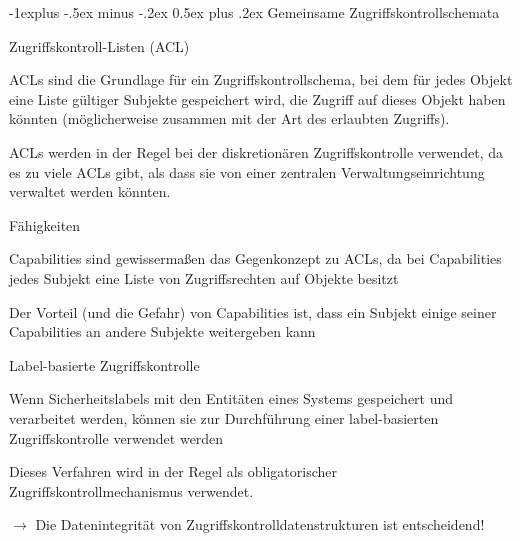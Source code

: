 \documentclass[a4paper]{article}
\makeatletter
\renewcommand{\subsection}{\@startsection{subsection}{2}{0mm}%
 {-1explus -.5ex minus -.2ex}%
 {0.5ex plus .2ex}%
 {\normalfont\normalsize\bfseries}}
\makeatother
\begin{document}
\begin{multicols}{3}

      \subsection{Gemeinsame Zugriffskontrollschemata}
      \begin{itemize*}
            \item Zugriffskontroll-Listen (ACL)
            \begin{itemize*}
                  \item ACLs sind die Grundlage für ein Zugriffskontrollschema, bei dem für jedes Objekt eine Liste gültiger Subjekte gespeichert wird, die Zugriff auf dieses Objekt haben könnten (möglicherweise zusammen mit der Art des erlaubten Zugriffs).
                  \item ACLs werden in der Regel bei der diskretionären Zugriffskontrolle verwendet, da es zu viele ACLs gibt, als dass sie von einer zentralen Verwaltungseinrichtung verwaltet werden könnten.
            \end{itemize*}
            \item Fähigkeiten
            \begin{itemize*}
                  \item Capabilities sind gewissermaßen das Gegenkonzept zu ACLs, da bei Capabilities jedes Subjekt eine Liste von Zugriffsrechten auf Objekte besitzt
                  \item Der Vorteil (und die Gefahr) von Capabilities ist, dass ein Subjekt einige seiner Capabilities an andere Subjekte weitergeben kann
            \end{itemize*}
            \item Label-basierte Zugriffskontrolle
            \begin{itemize*}
                  \item Wenn Sicherheitslabels mit den Entitäten eines Systems gespeichert und verarbeitet werden, können sie zur Durchführung einer label-basierten Zugriffskontrolle verwendet werden
                  \item Dieses Verfahren wird in der Regel als obligatorischer Zugriffskontrollmechanismus verwendet.
            \end{itemize*}
            \item $\rightarrow$ Die Datenintegrität von Zugriffskontrolldatenstrukturen ist entscheidend!
      \end{itemize*}


\end{multicols}
\end{document}
